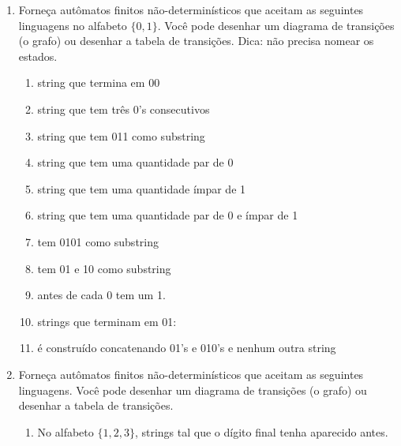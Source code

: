 \documentclass[12pt]{article}
\begin{document}
\begin{enumerate}

\item Forneça autômatos finitos não-determinísticos que aceitam as seguintes linguagens no alfabeto $\{0,1\}$. Você pode desenhar um diagrama de transições (o grafo) ou desenhar a tabela de transições. Dica: não precisa nomear os estados.

\begin{enumerate}

\item string que termina em 00

\item string que tem três 0's consecutivos

\item string que tem 011 como substring

\item string que tem uma quantidade par de 0

\item string que tem uma quantidade ímpar de 1

\item string que tem uma quantidade par de 0 e ímpar de 1

\item tem 0101 como substring

\item tem 01 e 10 como substring

\item antes de cada 0 tem um 1.

\item strings que terminam em 01:



\item é construído concatenando 01's e 010's e nenhum outra string

\end{enumerate}

\item Forneça autômatos finitos não-determinísticos que aceitam as seguintes linguagens. Você pode desenhar um diagrama de transições (o grafo) ou desenhar a tabela de transições.
\begin{enumerate}

\item No alfabeto $\{1,2,3\}$, strings tal que o dígito final tenha aparecido antes.


\end{enumerate}
\end{enumerate}
\end{document}
